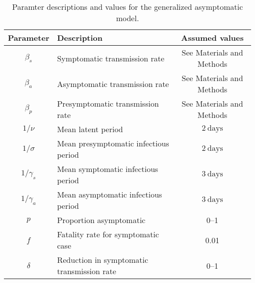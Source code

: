 \documentclass[12pt]{article}
\begin{document}
\begin{table}[h!]
  \begin{center}
    \begin{tabular}{c|l|c} %
      \textbf{Parameter} & \textbf{Description} & \textbf{Assumed values}\\
      \hline
      $\beta_s$ & Symptomatic transmission rate & See Materials and Methods\\
      \hline
      $\beta_a$ & Asymptomatic transmission rate & See Materials and Methods \\
      \hline
      $\beta_p$ & Presymptomatic transmission rate & See Materials and Methods \\
      \hline
      $1/\nu$ & Mean latent period & $2\ \mathrm{days}$\\
      \hline
      $1/\sigma$ & Mean presymptomatic infectious period & $2\ \mathrm{days}$\\
      \hline
      $1/\gamma_s$ & Mean symptomatic infectious period & $3\ \mathrm{days}$\\
      \hline
      $1/\gamma_a$ & Mean asymptomatic infectious period & $3\ \mathrm{days}$\\
      \hline
      $p$ & Proportion asymptomatic & 0--1\\
      \hline
      $f$ & Fatality rate for symptomatic case & 0.01\\
      \hline
      $\delta$ & Reduction in symptomatic transmission rate & 0--1\\
    \end{tabular}
    \caption{Paramter descriptions and values for the generalized asymptomatic model.}
    \label{tab:table1}
  \end{center}
\end{table}

\pagebreak
\end{document}
